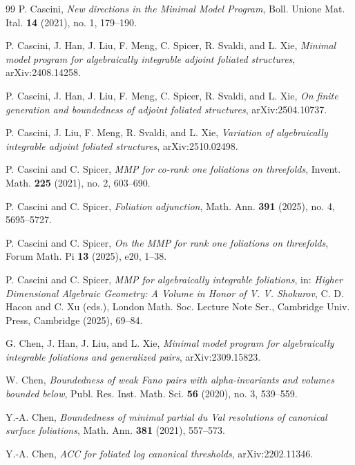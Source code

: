 \documentclass[11pt,reqno]{amsart}
\numberwithin{equation}{section}
\theoremstyle{definition}
\begin{document}
\begin{thebibliography}{99}
 P. Cascini, \textit{New directions in the Minimal Model Program}, Boll. Unione Mat. Ital. \textbf{14} (2021), no. 1, 179--190.

 P. Cascini, J. Han, J. Liu, F. Meng, C. Spicer, R. Svaldi, and L. Xie, \textit{Minimal model program for algebraically integrable adjoint foliated structures}, arXiv:2408.14258.

 P. Cascini, J. Han, J. Liu, F. Meng, C. Spicer, R. Svaldi, and L. Xie, \textit{On finite generation and boundedness of adjoint foliated structures}, arXiv:2504.10737.

 P. Cascini, J. Liu, F. Meng, R. Svaldi, and L. Xie, \textit{Variation of algebraically integrable adjoint foliated structures}, arXiv:2510.02498.

 P. Cascini and C. Spicer, \textit{MMP for co-rank one foliations on threefolds}, Invent. Math. \textbf{225} (2021), no. 2, 603--690.

 P. Cascini and C. Spicer, \textit{Foliation adjunction}, Math. Ann. \textbf{391} (2025), no. 4, 5695--5727.

 P. Cascini and C. Spicer, \textit{On the MMP for rank one foliations on threefolds}, Forum Math. Pi \textbf{13} (2025), e20, 1--38.

 P. Cascini and C. Spicer, \textit{MMP for algebraically integrable foliations}, in: \textit{Higher Dimensional Algebraic Geometry: A Volume in Honor of V. V. Shokurov}, C. D. Hacon and C. Xu (eds.), London Math. Soc. Lecture Note Ser., Cambridge Univ. Press, Cambridge (2025), 69--84.

 G. Chen, J. Han, J. Liu, and L. Xie, \textit{Minimal model program for algebraically integrable foliations and generalized pairs}, arXiv:2309.15823.

 W. Chen, \textit{Boundedness of weak Fano pairs with alpha-invariants and volumes bounded below}, Publ. Res. Inst. Math. Sci. \textbf{56} (2020), no. 3, 539--559.

 Y.-A. Chen, \textit{Boundedness of minimal partial du Val resolutions of canonical surface foliations}, Math. Ann. \textbf{381} (2021), 557--573.

 Y.-A. Chen, \textit{ACC for foliated log canonical thresholds}, arXiv:2202.11346.


\end{thebibliography}
\end{document}

